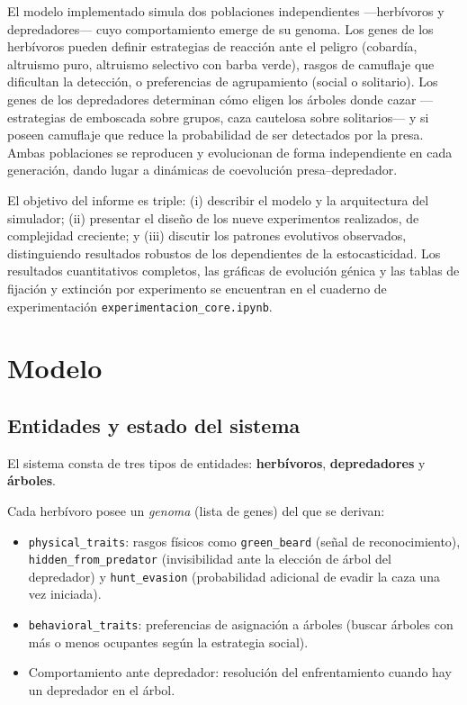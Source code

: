 \documentclass[11pt,a4paper]{article}
\begin{document}
El modelo implementado simula dos poblaciones independientes ---herb\'ivoros y depredadores--- cuyo comportamiento
emerge de su genoma. Los genes de los herb\'ivoros pueden definir estrategias de reacci\'on ante el peligro
(cobard\'ia, altruismo puro, altruismo selectivo con barba verde), rasgos de camuflaje que dificultan la
detecci\'on, o preferencias de agrupamiento (social o solitario). Los genes de los depredadores determinan
c\'omo eligen los \'arboles donde cazar ---estrategias de emboscada sobre grupos, caza cautelosa sobre
solitarios--- y si poseen camuflaje que reduce la probabilidad de ser detectados por la presa. Ambas
poblaciones se reproducen y evolucionan de forma independiente en cada generaci\'on, dando lugar a
din\'amicas de coevoluci\'on presa--depredador.

El objetivo del informe es triple: (i) describir el modelo y la arquitectura del simulador;
(ii) presentar el dise\~no de los nueve experimentos realizados, de complejidad creciente;
y (iii) discutir los patrones evolutivos observados, distinguiendo resultados robustos de los
dependientes de la estocasticidad. Los resultados cuantitativos completos, las gr\'aficas de
evoluci\'on g\'enica y las tablas de fijaci\'on y extinci\'on por experimento se encuentran en
el cuaderno de experimentaci\'on \texttt{experimentacion\_core.ipynb}.

\section{Modelo}

\subsection{Entidades y estado del sistema}

El sistema consta de tres tipos de entidades: \textbf{herb\'ivoros}, \textbf{depredadores} y \textbf{\'arboles}.

Cada herb\'ivoro posee un \textit{genoma} (lista de genes) del que se derivan:
\begin{itemize}
    \item \texttt{physical\_traits}: rasgos f\'isicos como \texttt{green\_beard} (se\~nal de reconocimiento),
    \texttt{hidden\_from\_predator} (invisibilidad ante la elecci\'on de \'arbol del depredador)
    y \texttt{hunt\_evasion} (probabilidad adicional de evadir la caza una vez iniciada).
    \item \texttt{behavioral\_traits}: preferencias de asignaci\'on a \'arboles
    (buscar \'arboles con m\'as o menos ocupantes seg\'un la estrategia social).
    \item Comportamiento ante depredador: resoluci\'on del enfrentamiento cuando hay un depredador en el \'arbol.
\end{itemize}
\end{document}
